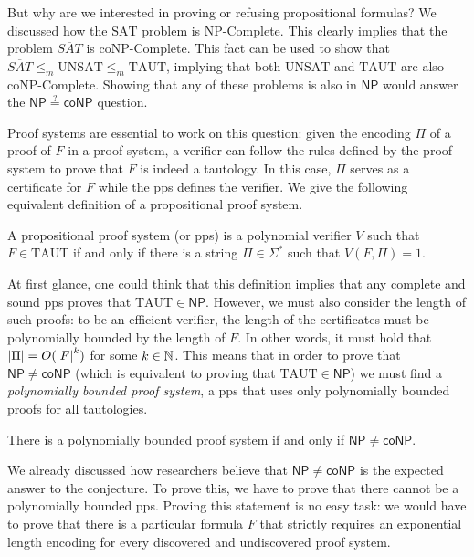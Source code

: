 But why are we interested in proving or refusing propositional formulas? We discussed how the $\mathrm{SAT}$ problem is \textsf{NP}-Complete. This clearly implies that the problem $\overline{SAT}$ is \textsf{coNP}-Complete. This fact can be used to show that $\overline{SAT} \leq_m \mathrm{UNSAT} \leq_m \mathrm{TAUT}$, implying that both $\mathrm{UNSAT}$ and $\mathrm{TAUT}$ are also \textsf{coNP}-Complete. Showing that any of these problems is also in $\mathsf{NP}$ would answer the $\mathsf{NP} \stackrel{?}{=} \mathsf{coNP}$ question.

Proof systems are essential to work on this question: given the encoding $\Pi$ of a proof of $F$ in a proof system, a verifier can follow the rules defined by the proof system to prove that $F$ is indeed a tautology. In this case, $\Pi$ serves as a certificate for $F$ while the pps defines the verifier. We give the following equivalent definition of a propositional proof system.

\begin{definition}
 A propositional proof system (or pps) is a polynomial verifier $V$ such that $F \in \mathrm{TAUT}$ if and only if there is a string $\Pi \in \Sigma^*$ such that $V(F,\Pi) = 1$.
\end{definition}

At first glance, one could think that this definition implies that any complete and sound pps proves that $\mathrm{TAUT} \in \mathsf{NP}$. However, we must also consider the length of such proofs: to be an efficient verifier, the length of the certificates must be polynomially bounded by the length of $F$. In other words, it must hold that $\left|\Pi\right| = O(\left|F\right|^k)$ for some $k \in \mathbb{N}$. This means that in order to prove that $\mathsf{NP} \neq \mathsf{coNP}$ (which is equivalent to proving that $\mathrm{TAUT} \in \mathsf{NP}$) we must find a \textit{polynomially bounded proof system}, a pps that uses only polynomially bounded proofs for all tautologies.

\begin{proposition}
 There is a polynomially bounded proof system if and only if $\mathsf{NP} \neq \mathsf{coNP}$.
\end{proposition}

We already discussed how researchers believe that $\mathsf{NP} \neq \mathsf{coNP}$ is the expected answer to the conjecture. To prove this, we have to prove that there cannot be a polynomially bounded pps. Proving this statement is no easy task: we would have to prove that there is a particular formula $F$ that strictly requires an exponential length encoding for every discovered and undiscovered proof system.

